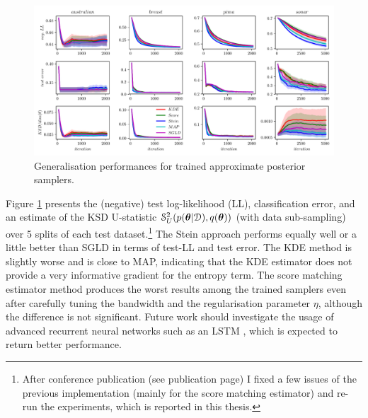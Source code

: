 \begin{figure}[t]
\centering
\includegraphics[width=1.0\linewidth]{figs/nn_sampler_results_new.pdf}
\vspace{-0.2in}
\caption{Generalisation performances for trained approximate posterior samplers.}
\vspace{-0.1in}
\label{fig:nn_sampler_results}
\end{figure}

Figure \ref{fig:nn_sampler_results} presents the (negative) test log-likelihood (LL), classification error, and an estimate of the KSD U-statistic $\mathcal{S}^2_U(p(\bm{\theta} | \mathcal{D}), q(\bm{\theta}))$ (with data sub-sampling) over 5 splits of each test dataset.\footnote{After conference publication (see publication page) I fixed a few issues of the previous implementation (mainly for the score matching estimator) and re-run the experiments, which is reported in this thesis.} 
%
The Stein approach performs equally well or a little better than SGLD in terms of test-LL and test error. The KDE method is slightly worse and is close to MAP, indicating that the KDE estimator does not provide a very informative gradient for the entropy term.
%
%
The score matching estimator method produces the worst results among the trained samplers even after carefully tuning the bandwidth and the regularisation parameter $\eta$, although the difference is not significant. 
%
Future work should investigate the usage of advanced recurrent neural networks such as an LSTM \citep{hochreiter:lstm1997}, which is expected to return better performance.

